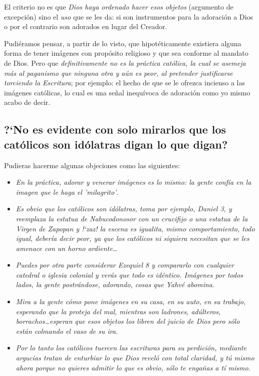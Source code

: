 \documentclass{article}
\begin{document}
\noindent
El criterio no es que \emph{Dios haya ordenado hacer esos objetos} (argumento de excepci\'on) sino el \emph{uso} que se les da: si son instrumentos para la adoraci\'on a Dios o por el contrario son adorados en lugar del Creador.

Pudi\'eramos pensar, a partir de lo visto, que hipot\'eticamente existiera alguna forma de tener im\'agenes con prop\'osito religioso y que sea conforme al mandato de Dios. Pero que \emph{definitivamente no es la pr\'actica cat\'olica, la cual se asemeja m\'as al paganismo que ninguna otra y a\'un es peor, al pretender justificarse torciendo la Escritura}; por ejemplo: el hecho de que se le ofrezca incienso a las im\'agenes cat\'olicas, lo cual es una se\~nal inequ\'ivoca de adoraci\'on como yo mismo acabo de decir.
\subsection{?`No es evidente con solo mirarlos que los cat\'olicos son id\'olatras digan lo que digan?}

Pudieras hacerme algunas objeciones como las siguientes:

\begin{itemize}
\item
\emph{En la pr\'actica, adorar y venerar im\'agenes es lo mismo: la gente conf\'{i}a en la imagen que le haga el 'milagrito'}.

\item
\emph{Es obvio que los cat\'olicos son id\'olatras, toma por ejemplo, Daniel 3, y reemplaza la estatua de Nabucodonosor con un crucifijo o una estatua de la Virgen de Zapopan y !`zaz! la escena es igualita, mismo comportamiento, todo igual, deber\'{i}a decir peor, ya que los cat\'olicos ni siquiera necesitan que se les amenace con un horno ardiente\ldots}

\item
\emph{Puedes por otra parte considerar Ezequiel 8 y compararlo con cualquier catedral o iglesia colonial y ver\'as que todo es id\'entico. Im\'agenes por todos lados, la gente postr\'andose, adorando, cosas que Yahv\'e abomina.}

\item
\emph{Mira a la gente c\'omo pone im\'agenes en su casa, en su auto, en su trabajo, esperando que la proteja del mal, mientras son ladrones, ad\'ulteros, borrachos\ldots esperan que esos objetos los libren del juicio de Dios pero s\'olo est\'an colmando el vaso de su ira.}

\item
\emph{Por lo tanto los cat\'olicos tuercen las escrituras para su perdici\'on, mediante argucias tratan de enturbiar lo que Dios revel\'o con total claridad, y t\'u mismo ahora porque no quieres admitir lo que es obvio, s\'olo te enga\~nas a t\'{i} mismo.}
\end{itemize}
\end{document}
